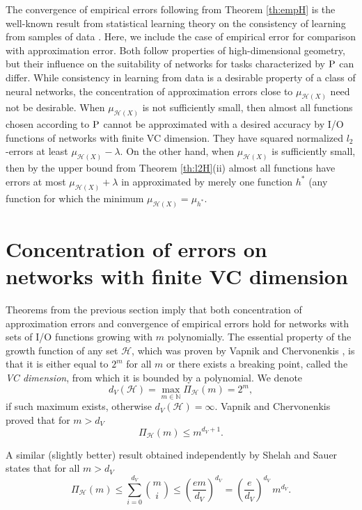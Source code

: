 \documentclass{elsarticle}
\def\n{\noindent}
\def\P{{\rm P}}
\def\cH{{\mathcal H}}
\def\bN{{\mathbb N}}
\def\n{\noindent}
\begin{document}
The convergence of empirical errors following from Theorem \ref{th:empH} is the well-known result from statistical learning theory on the consistency of learning from samples of data \cite{vach71}. Here, we include the case of empirical error for comparison with approximation error. Both follow properties of high-dimensional geometry, but their influence on the suitability of networks for tasks characterized by $\P$ can differ.
While consistency in learning from data is a desirable property of a class of neural networks, the concentration of approximation errors close to $\mu_{\cH(X)}$ need not be desirable. When  $\mu_{\cH(X)}$ is not sufficiently small, then almost all functions chosen according to $\P$ cannot be approximated with a desired accuracy by I/O functions of networks with finite VC dimension. They
have squared normalized $l_2$-errors at least $\mu_{\cH(X)} - \lambda$. On the other hand, when  $\mu_{\cH(X)}$ is sufficiently small, then by the upper bound from Theorem \ref{th:l2H}(ii) almost all functions have errors at most $\mu_{\cH(X)} +\lambda$ in approximated by merely one function $h^{*}$ (any function for which the minimum $\mu_{\cH(X)}= \mu_{h^*}$.




\section{Concentration of errors on networks with finite VC dimension}
\label{sec:VC}


Theorems from the previous section imply that both concentration of approximation errors and convergence of empirical errors hold for networks with sets of I/O functions growing with $m$ polynomially. The essential property of the growth function of any set $\cH$, which was proven by Vapnik and Chervonenkis \cite{vach71}, is that it is either equal to $2^m$ for all $m$ or there exists a breaking point, called the {\em VC dimension}, from which it is bounded by a polynomial.  We denote
$$d_{V}(\cH) = \max_{m \in \bN} \Pi_{\cH}(m) = 2^m,$$
\n if such maximum exists, otherwise $d_{V}(\cH) = \infty$.
Vapnik and Chervonenkis \cite[Theorem 1]{vach71} proved that for $m>d_V$
\begin{equation}
\Pi_{\cH}(m) \leq m^{d_V +1}.
\label{eq:VC}
\end{equation}

\n A similar (slightly better) result obtained independently by Shelah \cite{sh72} and Sauer \cite{sa72}
states that for all $m>d_V$
\begin{equation}
\Pi_{\cH}(m) \leq \sum_{i=0}^{d_V} \binom{m}{i} \leq \left ( \frac{em}{d_V} \right )^{d_V} = \left ( \frac{e}{d_V} \right )^{d_V}\, m^{d_V}.
\label{eq:SaSh}
\end{equation}
\end{document}
